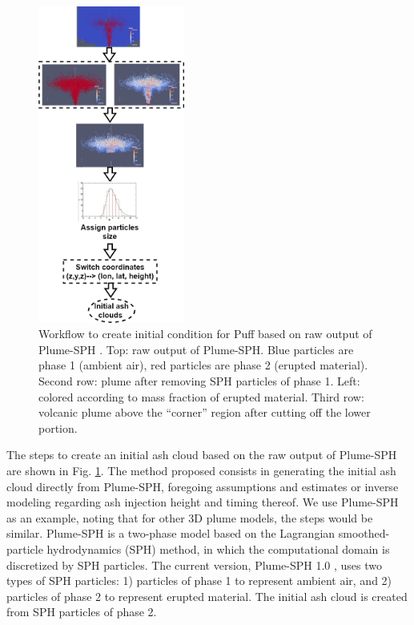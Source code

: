 \documentclass[draft,linenumbers]{agujournal2019}
\begin{document}
\begin{figure}
\center
\includegraphics[width=0.43\textwidth]{Figures/Creat_initial_Ash}
\caption{Workflow to create initial condition for Puff based on raw output of Plume-SPH \citep{cao2018plume}. Top: raw output of Plume-SPH. Blue particles are phase 1 (ambient air), red particles are phase 2 (erupted material). Second row: plume after removing SPH particles of phase 1. Left: colored according to mass fraction of erupted material. Third row: volcanic plume above the ``corner'' region after cutting off the lower portion.}
\label{fig:create-initial-ash-plume-sph}
\end{figure}

The steps to create an initial ash cloud based on the raw output of Plume-SPH are shown in Fig. \ref{fig:create-initial-ash-plume-sph}.
The method proposed consists in generating the initial ash cloud directly from Plume-SPH, foregoing assumptions and estimates or inverse modeling regarding ash injection height and timing thereof.
We use Plume-SPH as an example, noting that for other 3D plume models, the steps would be similar. Plume-SPH is a two-phase model based on the Lagrangian smoothed-particle hydrodynamics (SPH) method, in which the computational domain is discretized by SPH particles. The current version, Plume-SPH 1.0 \citep{cao2018plume}, uses two types of SPH particles: 1) particles of phase 1 to represent ambient air, and 2) particles of phase 2 to represent erupted material. The initial ash cloud is created from SPH particles of phase 2.
\end{document}
